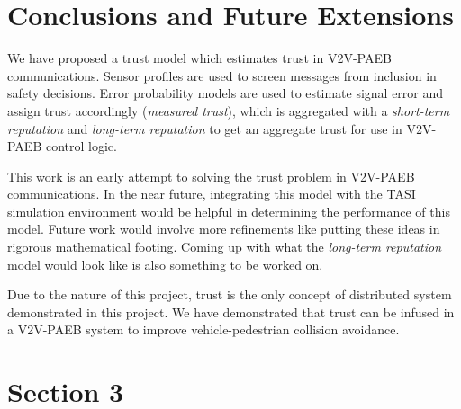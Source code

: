 \documentclass[conference]{IEEEtran}
\begin{document}
\section{Conclusions and Future Extensions}
We have proposed a trust model which estimates trust in V2V-PAEB communications. Sensor profiles are used to screen messages from inclusion in safety decisions. Error probability models are used to estimate signal error and assign trust accordingly (\textit{measured trust}), which is aggregated with a \textit{short-term reputation} and \textit{long-term reputation} to get an aggregate trust for use in V2V-PAEB control logic.

This work is an early attempt to solving the trust problem in V2V-PAEB communications. In the near future, integrating this model with the TASI simulation environment would be helpful in determining the performance of this model. Future work would involve more refinements like putting these ideas in rigorous mathematical footing. Coming up with what the \textit{long-term reputation} model would look like is also something to be worked on.

Due to the nature of this project, trust is the only concept of distributed system demonstrated in this project. We have demonstrated that trust can be infused in a V2V-PAEB system to improve vehicle-pedestrian collision avoidance. 
 
\section{Section 3} \label{section3}





 
 
 


%
%
\end{document}
